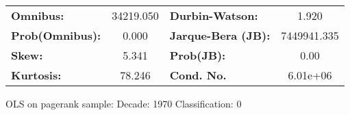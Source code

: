 \begin{center}
\begin{tabular}{lccccc}
\bottomrule
\end{tabular}
\begin{tabular}{lclc}
\textbf{Omnibus:}       & 34219.050 & \textbf{  Durbin-Watson:     } &      1.920   \\
\textbf{Prob(Omnibus):} &    0.000  & \textbf{  Jarque-Bera (JB):  } & 7449941.335  \\
\textbf{Skew:}          &    5.341  & \textbf{  Prob(JB):          } &       0.00   \\
\textbf{Kurtosis:}      &   78.246  & \textbf{  Cond. No.          } &   6.01e+06   \\
\bottomrule
\end{tabular}
\end{center}
\break
OLS on pagerank sample: Decade: 1970 Classification: 0
